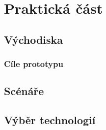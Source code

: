 \chapter{Praktická část}

\section{Východiska}
\subsection{Cíle prototypu}

\section{Scénáře}

\section{Výběr technologií}

